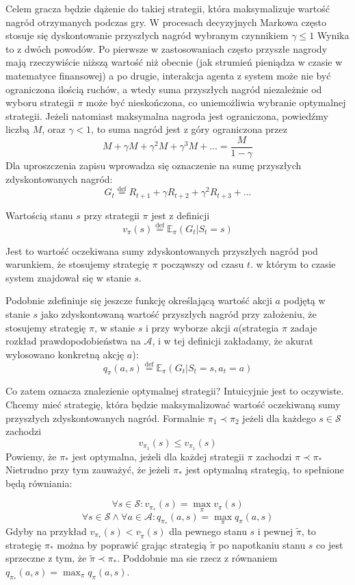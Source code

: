 \documentclass[licencjacka]{pracamgr}
\begin{document}
Celem gracza będzie dążenie do takiej strategii, która maksymalizuje wartość nagród otrzymanych podczas gry.  W procesach decyzyjnych Markowa często stosuje się dyskontowanie przyszłych nagród wybranym czynnikiem $\gamma\leq1$ Wynika to z dwóch powodów. Po pierwsze w zastosowaniach często przyszłe nagrody mają rzeczywiście niższą wartość niż obecnie (jak strumień pieniądza w czasie w matematyce finansowej) a po drugie, interakcja agenta z system może nie być ograniczona ilością ruchów, a wtedy suma przyszłych nagród niezależnie od wyboru strategii $\pi$ może być nieskończona, co uniemożliwia wybranie optymalnej strategii. Jeżeli natomiast maksymalna nagroda jest ograniczona, powiedźmy liczbą $M$, oraz $\gamma<1$, to suma nagród jest z góry ograniczona przez
$$M+\gamma M +\gamma^{2}M+\gamma^{3}M+...  = \frac{M}{1-\gamma}$$
Dla uproszczenia zapisu wprowadza się oznaczenie na sumę przyszłych zdyskontowanych nagród:
$$G_{t} \stackrel{\text{def}}{=} R_{t+1} + \gamma R_{t+2} + \gamma^{2}R_{t+3} +...$$

Wartością stanu $s$ przy strategii $\pi$ jest z definicji 
$$v_{\pi}(s)\stackrel{\text{def}}{=} \mathbb{E}_{\pi}(G_{t}| S_{t} = s) $$

Jest to wartość oczekiwana sumy zdyskontowanych przyszłych nagród pod warunkiem, że stosujemy strategię $\pi$ począwszy od czasu $t$. w którym to czasie system znajdował się w stanie $s$. 

Podobnie zdefiniuje się jeszcze funkcję określającą wartość akcji $a$ podjętą w stanie $s$ jako zdyskontowaną wartość przyszłych nagród przy założeniu, że stosujemy strategię $\pi$, w stanie $s$ i przy wyborze akcji $a$(strategia $\pi$ zadaje rozkład prawdopodobieństwa na $\mathcal{A}$, i w tej definicji zakładamy, że akurat wylosowano konkretną akcję $a$):
$$q_{\pi}(a,s) \stackrel{\text{def}}{=} \mathbb{E}_{\pi}(G_{t}| S_{t} = s, a_{t} = a) $$

Co zatem oznacza znalezienie optymalnej strategii? Intuicyjnie jest to oczywiste. Chcemy mieć strategię, która będzie maksymalizować wartość oczekiwaną sumy przyszłych zdyskontowanych nagród. Formalnie $\pi_{1}\prec\pi_{2}$ jeżeli dla każdego $s\in\mathcal{S}$ zachodzi $$v_{\pi_{1}}(s)\leq v_{\pi_{1}}(s)$$
Powiemy, że $\pi_{*}$ jest optymalna, jeżeli dla każdej strategii $\pi$ zachodzi   $\pi\prec\pi_{*}$ Nietrudno przy tym zauważyć, że jeżeli $\pi_{*}$ jest optymalną strategią, to spełnione będą równiania:


$$\forall s\in \mathcal{S}: v_{\pi_{*}}(s) =\max_{\pi} v_{\pi}(s)$$ $$\forall s\in\mathcal{S}\wedge \forall a\in\mathcal{A}: q_{\pi_{*}}(a,s) = \max_{\pi} q_{\pi}(a,s)$$
Gdyby na przykład  $v_{\pi_{*}}(s)<v_{\tilde{\pi}}(s)$ dla pewnego stanu $s$ i  pewnej $\tilde{\pi}$, to  strategię $\pi_{*}$ można by poprawić grając strategią $\tilde{\pi}$ po napotkaniu stanu $s$ co jest sprzeczne z tym, że   $\tilde{\pi}\prec\pi_{*}$. Poddobnie ma sie rzecz z równaniem $q_{\pi_{*}}(a,s) = \max_{\pi} q_{\pi}(a,s)$.\\
\end{document}
